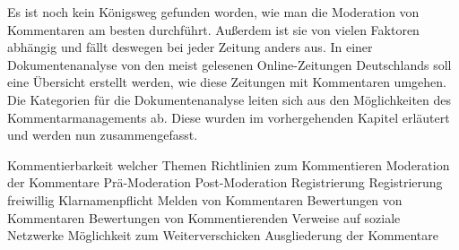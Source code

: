 

Es ist noch kein Königsweg gefunden worden, wie man die Moderation von Kommentaren am besten durchführt. Außerdem ist sie von vielen Faktoren abhängig und fällt deswegen bei jeder Zeitung anders aus. In einer Dokumentenanalyse von den meist gelesenen Online-Zeitungen Deutschlands soll eine Übersicht erstellt werden, wie diese Zeitungen mit Kommentaren umgehen. Die Kategorien für die Dokumentenanalyse leiten sich aus den Möglichkeiten des Kommentarmanagements ab. Diese wurden im vorhergehenden Kapitel erläutert und werden nun zusammengefasst. 

Kommentierbarkeit welcher Themen
Richtlinien zum Kommentieren 
Moderation der Kommentare
Prä-Moderation
Post-Moderation
Registrierung
Registrierung freiwillig
Klarnamenpflicht
Melden von Kommentaren
Bewertungen von Kommentaren
Bewertungen von Kommentierenden
Verweise  auf soziale Netzwerke
Möglichkeit zum Weiterverschicken
Ausgliederung der Kommentare